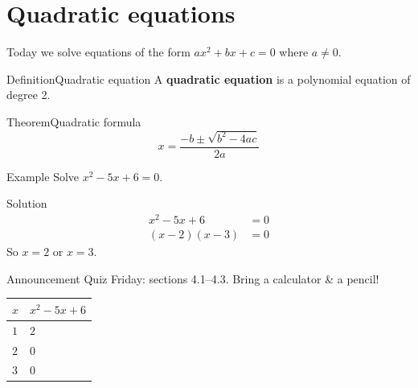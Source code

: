 \documentclass[11pt]{article}
\title{#1}\author{#2}\date{}%
\begin{document}

\section*{Quadratic equations}

Today we solve equations of the form \(ax^{2} + bx + c = 0\) where \(a \neq 0\).

\begin{cldefinition}{Definition}{Quadratic equation}
A \textbf{quadratic equation} is a polynomial equation of degree 2.

\end{cldefinition}

\begin{cltheorem}{Theorem}{Quadratic formula}
\[
x = \frac{-b \pm \sqrt{b^{2} - 4ac}}{2a}
\]
\end{cltheorem}

\begin{clexample}{Example}{}
Solve \(x^{2} - 5x + 6 = 0\).

\begin{clsolution}{Solution}
\begin{align*}
x^{2} - 5x + 6 &= 0 \\
(x - 2)(x - 3) &= 0
\end{align*}
So \(x = 2\) or \(x = 3\).

\end{clsolution}
\end{clexample}

\begin{clannouncement}{Announcement}{}
Quiz Friday: sections 4.1–4.3. Bring a calculator \& a pencil!

\end{clannouncement}

\begin{center}
\begin{tabular}{ll}
\toprule
\(x\) & \(x^{2} - 5x + 6\) \\
\midrule
\(1\) & \(2\) \\
\(2\) & \(0\) \\
\(3\) & \(0\) \\
\bottomrule
\end{tabular}
\end{center}
\end{document}
